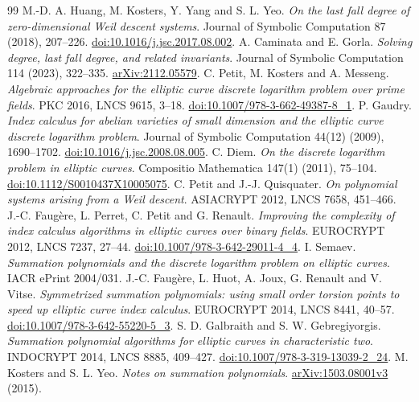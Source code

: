 \documentclass[11pt]{article}
\theoremstyle{definition}\newtheorem{definition}[theorem]{Definition}
\theoremstyle{remark}\newtheorem{remark}[theorem]{Remark}
\begin{document}
\begin{thebibliography}{99}
 M.-D. A. Huang, M. Kosters, Y. Yang and S. L. Yeo.
\emph{On the last fall degree of zero-dimensional Weil descent systems}.
Journal of Symbolic Computation 87 (2018), 207--226.
\href{https://doi.org/10.1016/j.jsc.2017.08.002}{doi:10.1016/j.jsc.2017.08.002}.
 A. Caminata and E. Gorla.
\emph{Solving degree, last fall degree, and related invariants}.
Journal of Symbolic Computation 114 (2023), 322--335.
\href{https://arxiv.org/abs/2112.05579}{arXiv:2112.05579}.
 C. Petit, M. Kosters and A. Messeng.
\emph{Algebraic approaches for the elliptic curve discrete logarithm problem over prime fields}.
PKC 2016, LNCS 9615, 3--18.
\href{https://doi.org/10.1007/978-3-662-49387-8_1}{doi:10.1007/978-3-662-49387-8\_1}.
 P. Gaudry.
\emph{Index calculus for abelian varieties of small dimension and the elliptic curve discrete logarithm problem}.
Journal of Symbolic Computation 44(12) (2009), 1690--1702.
\href{https://doi.org/10.1016/j.jsc.2008.08.005}{doi:10.1016/j.jsc.2008.08.005}.
 C. Diem.
\emph{On the discrete logarithm problem in elliptic curves}.
Compositio Mathematica 147(1) (2011), 75--104.
\href{https://doi.org/10.1112/S0010437X10005075}{doi:10.1112/S0010437X10005075}.
 C. Petit and J.-J. Quisquater.
\emph{On polynomial systems arising from a Weil descent}.
ASIACRYPT 2012, LNCS 7658, 451--466.
 J.-C. Faug\`ere, L. Perret, C. Petit and G. Renault.
\emph{Improving the complexity of index calculus algorithms in elliptic curves over binary fields}.
EUROCRYPT 2012, LNCS 7237, 27--44.
\href{https://doi.org/10.1007/978-3-642-29011-4_4}{doi:10.1007/978-3-642-29011-4\_4}.
 I. Semaev.
\emph{Summation polynomials and the discrete logarithm problem on elliptic curves}.
IACR ePrint 2004/031.
 J.-C. Faug\`ere, L. Huot, A. Joux, G. Renault and V. Vitse.
\emph{Symmetrized summation polynomials: using small order torsion points to speed up elliptic curve index calculus}.
EUROCRYPT 2014, LNCS 8441, 40--57.
\href{https://doi.org/10.1007/978-3-642-55220-5_3}{doi:10.1007/978-3-642-55220-5\_3}.
 S. D. Galbraith and S. W. Gebregiyorgis.
\emph{Summation polynomial algorithms for elliptic curves in characteristic two}.
INDOCRYPT 2014, LNCS 8885, 409--427.
\href{https://doi.org/10.1007/978-3-319-13039-2_24}{doi:10.1007/978-3-319-13039-2\_24}.
 M. Kosters and S. L. Yeo.
\emph{Notes on summation polynomials}.
\href{https://arxiv.org/abs/1503.08001v3}{arXiv:1503.08001v3} (2015).

\end{thebibliography}
\end{document}
